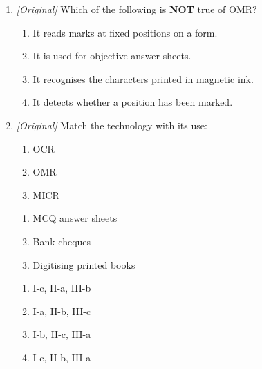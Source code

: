 \documentclass[11pt]{article}
\begin{document}
\begin{enumerate}[label=\textbf{Q\arabic*.}, leftmargin=*]
\begin{enumerate}[label=\Alph*.]
    \item Reading barcodes
    \item Converting scanned text
  \end{enumerate}
\item \textit{[Original]} Which of the following is \textbf{NOT} true of
  OMR?
  \begin{enumerate}[label=\Alph*.]
    \item It reads marks at fixed positions on a form.
    \item It is used for objective answer sheets.
    \item It recognises the characters printed in magnetic ink.
    \item It detects whether a position has been marked.
  \end{enumerate}
\item \textit{[Original]} Match the technology with its use:
  \begin{enumerate}[label=\Roman*.]
    \item OCR
    \item OMR
    \item MICR
  \end{enumerate}
  \begin{enumerate}[label=(\alph*)]
    \item MCQ answer sheets
    \item Bank cheques
    \item Digitising printed books
  \end{enumerate}
  \begin{enumerate}[label=\Alph*.]
    \item I-c, II-a, III-b
    \item I-a, II-b, III-c
    \item I-b, II-c, III-a
    \item I-c, II-b, III-a
  \end{enumerate}


\end{enumerate}
\end{document}

